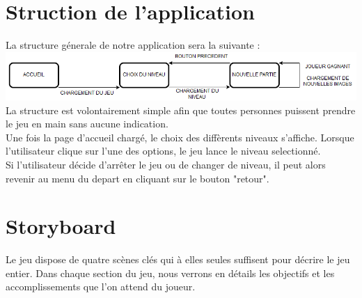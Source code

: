 \documentclass{article}
\begin{document}
\section{Struction de l'application}

La structure g\'enerale de notre application sera la suivante :
\vspace{0.5cm}\\
\includegraphics[width=\textwidth]{plan}
\vspace{0.5cm}\\
\hspace*{0.6cm}La structure est volontairement simple afin que toutes personnes puissent prendre le jeu en main sans aucune indication.\\
Une fois la page d'accueil charg\'e, le choix des diff\`erents niveaux s'affiche. Lorsque l'utilisateur clique sur l'une des options, le jeu lance le niveau selectionn\'e.\\
Si l'utilisateur d\'ecide d'arr\^eter le jeu ou de changer de niveau, il peut alors revenir au menu du depart en cliquant sur le bouton "retour". 

\section{Storyboard}
\hspace*{0.6cm}Le jeu dispose de quatre sc\`enes cl\'es qui \`a elles seules suffisent pour d\'ecrire le jeu entier. Dans chaque section du jeu, nous verrons en d\'etails les objectifs et les accomplissements que l'on attend du joueur. 
\end{document}
